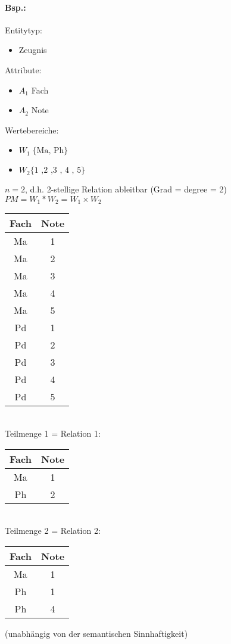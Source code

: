 \paragraph{Bsp.:} \parskp
Entitytyp: 
\begin{itemize}
\item Zeugnis
\end{itemize}
Attribute:
\begin{itemize}
\item $A_1$ Fach
\item $A_2$ Note
\end{itemize}
Wertebereiche:
\begin{itemize}
\item $W_1 \; \{\text{Ma, Ph}\}$
\item $W_2 \{\text{1 ,2 ,3 , 4 , 5}\}$
\end{itemize}
$n=2$, d.h. 2-stellige Relation ableitbar (Grad = degree = 2)\\
$PM = W_1 * W_2 = W_1 \times W_2$\\
\begin{tabular}{c | c}
Fach & Note\\
\hline
Ma & 1\\
Ma & 2\\
Ma & 3\\
Ma & 4\\
Ma & 5\\
Pd & 1\\
Pd & 2\\
Pd & 3\\
Pd & 4\\
Pd & 5\\
\end{tabular}\\
Teilmenge 1  = Relation 1:\\
\begin{tabular}{c | c}
Fach & Note \\
\hline
Ma & 1\\
Ph & 2\\
\end{tabular} \\
Teilmenge 2  = Relation 2:\\
\begin{tabular}{c | c}
Fach & Note \\
\hline
Ma & 1\\
Ph & 1\\
Ph & 4\\
\end{tabular}  (unabhängig von der semantischen Sinnhaftigkeit)
